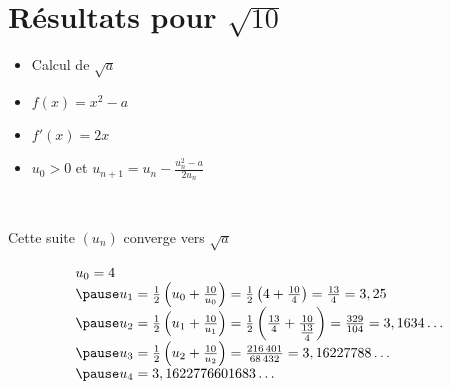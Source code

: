 \section{Résultats pour $\sqrt{10}$}

\begin{frame}
\medskip
\begin{minipage}{0.47\textwidth}
\begin{itemize}
  \item Calcul de $\sqrt{a}$
  \item $f(x)=x^2-a$ 
  \item $f'(x)=2x$
  \item $u_0>0$ et $u_{n+1} = u_n - \frac{u_n^2-a}{2u_n}$
\end{itemize}  
\end{minipage}
\pause 
\begin{minipage}{0.49\textwidth}
\hspace*{-2em}

\   
\end{minipage}
\medskip
\pause 
\begin{proposition}
\label{prop:heron}
Cette suite $(u_n)$ converge vers $\sqrt{a}$
\end{proposition}
\pause 
$$
\begin{array}{l}
  u_0 = 4     \\
\pause 
  u_1 = \frac12 \left(u_0+\frac{10}{u_0}\right) = \frac12\left(4+\frac{10}{4}\right) = \frac{13}{4} = 3,25 \\
\pause 
  u_2 = \frac12 \left(u_1+\frac{10}{u_1}\right) = \frac12\left(\tfrac{13}{4}+\frac{10}{\tfrac{13}{4}}\right) 
  = \frac{329}{104} = 3,1634\ldots \\
\pause 
  u_3 = \frac12 \left(u_2+\frac{10}{u_2}\right) = \frac{216\,401}{68\,432} = 3,16227788 \ldots \\
\pause 
  u_4 = 3,1622776601683\ldots  
\end{array}
$$

\end{frame}


